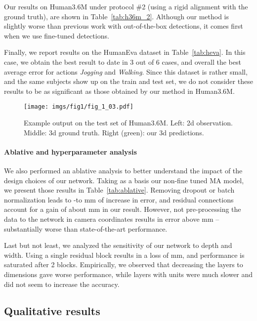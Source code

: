 \documentclass[10pt,twocolumn,letterpaper]{article}
\begin{document}
Our results on Human3.6M under protocol \#2 (using a rigid alignment with the ground truth), are shown in Table~\ref{tab:h36m_2}. 
Although our method is slightly worse than previous work with out-of-the-box detections, it comes first when we use fine-tuned detections.

Finally, we report results on the HumanEva dataset in Table~\ref{tab:heva}. In this case, we obtain the best result to date in 3 out of 6 cases, and overall the best average error for actions \textit{Jogging} and \textit{Walking}. Since this dataset is rather small, and the same subjects show up on the train and test set, we do not consider these results to be as significant as those obtained by our method in Human3.6M.

\begin{figure*}
  \texttt{[image: imgs/fig1/fig\_1\_03.pdf]}
  \vspace{-3mm}
  \caption{Example output on the test set of Human3.6M. Left: 2d observation. Middle: 3d ground truth. Right (green): our 3d predictions.
}
  \label{fig:qualitative}
\end{figure*}

\paragraph{Ablative and hyperparameter analysis}

We also performed an ablative analysis to better understand the impact of the design choices of our network. Taking as a basis our non-fine tuned MA model, we present those results in Table~\ref{tab:ablative}. Removing dropout or batch normalization leads to -to mm of increase in error, and residual connections account for a gain of about  mm in our result.
However, not pre-processing the data to the network in camera coordinates results in error above  mm -- substantially worse than state-of-the-art performance.

Last but not least, we analyzed the sensitivity of our network to depth and width. Using a single residual block results in a loss of  mm, and performance is saturated after 2 blocks. Empirically, we observed that decreasing the layers to  dimensions gave worse performance, while layers with  units were much slower and did not seem to increase the accuracy.

\subsection{Qualitative results}
\end{document}
